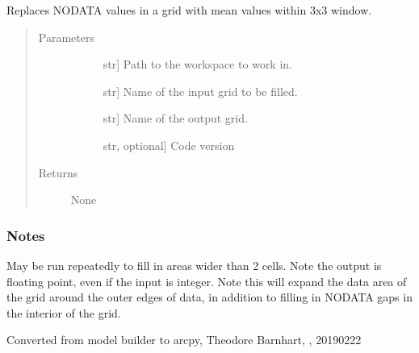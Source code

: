 \documentclass[letterpaper,10pt,english]{sphinxmanual}
\begin{document}
\begin{fulllineitems}
\label{\detokenize{elevationTools:elevationTools.fillNoData}}
Replaces NODATA values in a grid with mean values within 3x3 window.
\begin{quote}\begin{description}
\item[{Parameters}] \leavevmode\begin{description}
\item[{}] \leavevmode{[}str{]}
Path to the workspace to work in.

\item[{}] \leavevmode{[}str{]}
Name of the input grid to be filled.

\item[{}] \leavevmode{[}str{]}
Name of the output grid.

\item[{}] \leavevmode{[}str, optional{]}
Code version

\end{description}

\item[{Returns}] \leavevmode\begin{description}
\item[{None}] \leavevmode
\end{description}

\end{description}\end{quote}
\subsubsection*{Notes}

May be run repeatedly to fill in areas wider than 2 cells. Note the output is floating point, even if the input is integer. Note this will expand the data area of the grid around the outer edges of data, in addition to filling in NODATA gaps in the interior of the grid.

Converted from model builder to arcpy, Theodore Barnhart, , 20190222

\end{fulllineitems}
\end{document}
